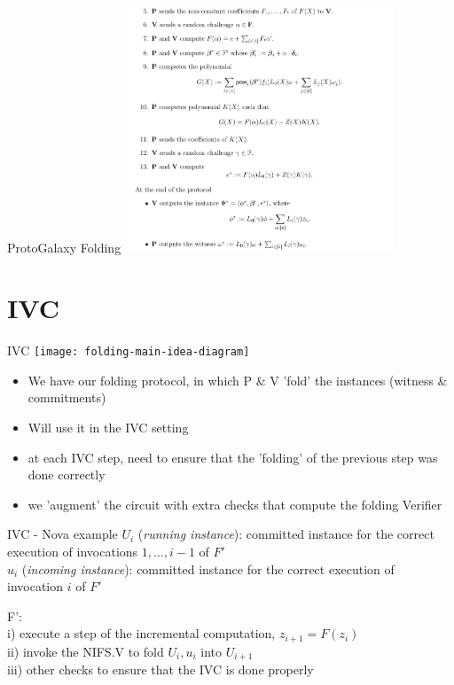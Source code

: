 \documentclass[t]{beamer}
\begin{document}
\begin{frame}{ProtoGalaxy Folding}
  \includegraphics[width=8cm]{./imgs/protogalaxy-screenshot}
\end{frame}

\section[IVC]{IVC}

\begin{frame}{IVC}
  \texttt{[image: folding-main-idea-diagram]}
  \begin{itemize}
    \item We have our folding protocol, in which P \& V 'fold' the instances (witness \& commitments)
    \item Will use it in the IVC setting
    \item at each IVC step, need to ensure that the 'folding' of the previous step was done correctly
    \item we 'augment' the circuit with extra checks that compute the folding Verifier
  \end{itemize}
\end{frame}

\begin{frame}{IVC - Nova example}
  \small{
  $U_i$ (\emph{running instance}): committed instance for the correct execution of invocations $1, \ldots, i-1$ of $F'$\\
  $u_i$ (\emph{incoming instance}): committed instance for the correct execution of invocation $i$ of $F'$
  }


  \vspace{4cm}
  
  \small{
  F':\\
  i) execute a step of the incremental computation, $z_{i+1} = F(z_i)$\\
  ii) invoke the NIFS.V to fold $U_i, u_i$ into $U_{i+1}$\\
  iii) other checks to ensure that the IVC is done properly
  }
\end{frame}
\end{document}
